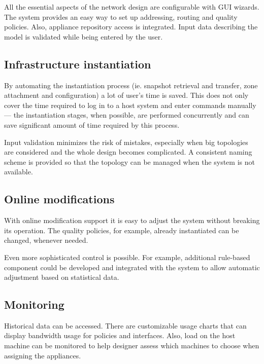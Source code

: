 \documentclass[11pt]{book}
\begin{document}
        All the essential aspects of the network design are configurable with GUI wizards. The system provides an easy
        way to set up addressing, routing and quality policies. Also, appliance repository access is integrated. Input
        data describing the model is validated while being entered by the user. 


      \subsection{Infrastructure instantiation}
      \label{sub:uc:enhance:instantiation}

        By automating the instantiation process (ie. snapshot retrieval and transfer, zone attachment and configuration)
        a lot of user's time is saved. This does not only cover the time required to log in to a host system and enter
        commands manually --- the instantiation stages, when possible, are performed concurrently and can save
        significant amount of time required by this process.

        Input validation minimizes the risk of mistakes, especially when big topologies are considered and the whole
        design becomes complicated. A consistent naming scheme is provided so that the topology can be managed when the
        system is not available.



      \subsection{Online modifications}
      \label{sub:uc:enhance:online}

        With online modification support it is easy to adjust the system without breaking its operation. The quality
        policies, for example, already instantiated can be changed, whenever needed.

        Even more sophisticated control is possible. For example, additional rule-based component could be developed and
        integrated with the system to allow automatic adjustment based on statistical data.


      \subsection{Monitoring}
      \label{sub:uc:enhance:monitoring}

        Historical data can be accessed. There are customizable usage charts that can display bandwidth usage for
        policies and interfaces. Also, load on the host machine can be monitored to help designer assess which machines
        to choose when assigning the appliances.
\end{document}
